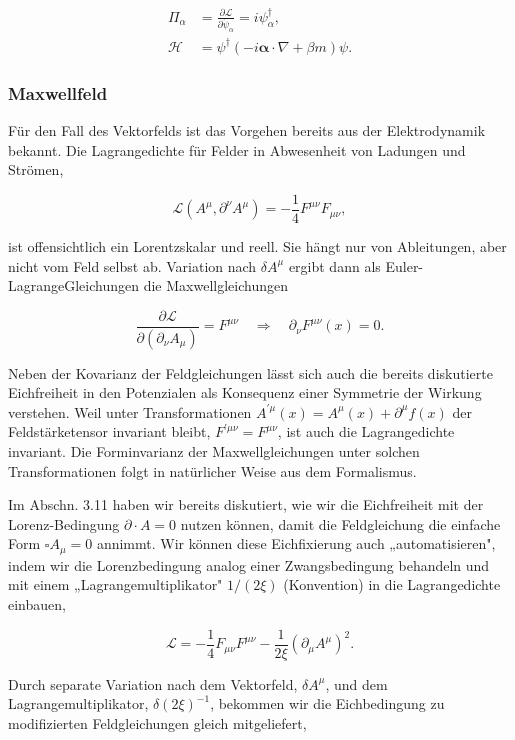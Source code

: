 \documentclass[10pt, letterpaper]{article}
\begin{document}
$$
\begin{aligned}
\Pi_{\alpha} & =\frac{\partial \mathscr{L}}{\partial \dot{\psi}_{\alpha}}=i \psi_{\alpha}^{\dagger}, \\
\mathscr{H} & =\psi^{\dagger}(-i \boldsymbol{\alpha} \cdot \nabla+\beta m) \psi .
\end{aligned}
$$

\subsubsection*{Maxwellfeld}
Für den Fall des Vektorfelds ist das Vorgehen bereits aus der Elektrodynamik bekannt. Die Lagrangedichte für Felder in Abwesenheit von Ladungen und Strömen,

$$
\mathscr{L}\left(A^{\mu}, \partial^{\nu} A^{\mu}\right)=-\frac{1}{4} F^{\mu \nu} F_{\mu \nu},
$$

ist offensichtlich ein Lorentzskalar und reell. Sie hängt nur von Ableitungen, aber nicht vom Feld selbst ab. Variation nach $\delta A^{\mu}$ ergibt dann als Euler-LagrangeGleichungen die Maxwellgleichungen

$$
\frac{\partial \mathscr{L}}{\partial\left(\partial_{\nu} A_{\mu}\right)}=F^{\mu \nu} \quad \Rightarrow \quad \partial_{\nu} F^{\mu \nu}(x)=0 .
$$

Neben der Kovarianz der Feldgleichungen lässt sich auch die bereits diskutierte Eichfreiheit in den Potenzialen als Konsequenz einer Symmetrie der Wirkung verstehen. Weil unter Transformationen $A^{\prime \mu}(x)=A^{\mu}(x)+\partial^{\mu} f(x)$ der Feldstärketensor invariant bleibt, $F^{\prime \mu \nu}=F^{\mu \nu}$, ist auch die Lagrangedichte invariant. Die Forminvarianz der Maxwellgleichungen unter solchen Transformationen folgt in natürlicher Weise aus dem Formalismus.

Im Abschn. 3.11 haben wir bereits diskutiert, wie wir die Eichfreiheit mit der Lorenz-Bedingung $\partial \cdot A=0$ nutzen können, damit die Feldgleichung die einfache Form $\square A_{\mu}=0$ annimmt. Wir können diese Eichfixierung auch „automatisieren", indem wir die Lorenzbedingung analog einer Zwangsbedingung behandeln und mit einem „Lagrangemultiplikator" $1 /(2 \xi)$ (Konvention) in die Lagrangedichte einbauen,

$$
\mathscr{L}=-\frac{1}{4} F_{\mu \nu} F^{\mu \nu}-\frac{1}{2 \xi}\left(\partial_{\mu} A^{\mu}\right)^{2} .
$$

Durch separate Variation nach dem Vektorfeld, $\delta A^{\mu}$, und dem Lagrangemultiplikator, $\delta(2 \xi)^{-1}$, bekommen wir die Eichbedingung zu modifizierten Feldgleichungen gleich mitgeliefert,
\end{document}
